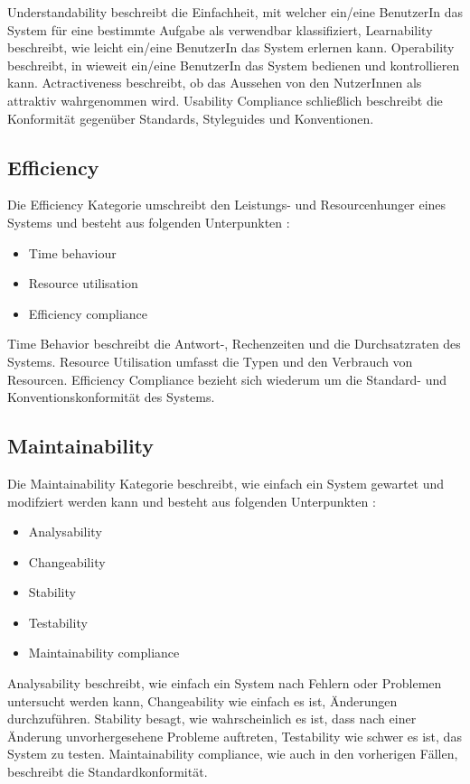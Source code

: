 Understandability beschreibt die Einfachheit, mit welcher ein/eine BenutzerIn das System für eine bestimmte Aufgabe als verwendbar klassifiziert, Learnability beschreibt, wie leicht ein/eine BenutzerIn das System erlernen kann. Operability beschreibt, in wieweit ein/eine BenutzerIn das System bedienen und kontrollieren kann. Actractiveness beschreibt, ob das Aussehen von den NutzerInnen als attraktiv wahrgenommen wird. Usability Compliance schließlich beschreibt die Konformität gegenüber Standards, Styleguides und Konventionen. \cite[S. 9-10]{ISO_SQ}

\subsection{Efficiency}
Die Efficiency Kategorie umschreibt den Leistungs- und Resourcenhunger eines Systems und besteht aus folgenden Unterpunkten \cite[S. 7]{ISO_SQ}:

\begin{itemize}
  \item \glqq Time behaviour\grqq
  \item \glqq Resource utilisation\grqq
  \item \glqq Efficiency compliance\grqq
\end{itemize}

Time Behavior beschreibt die Antwort-, Rechenzeiten und die Durchsatzraten des Systems. Resource Utilisation umfasst die Typen und den Verbrauch von Resourcen. Efficiency Compliance bezieht sich wiederum um die Standard- und Konventionskonformität des Systems. \cite[S. 10]{ISO_SQ}

\subsection{Maintainability}
Die Maintainability Kategorie beschreibt, wie einfach ein System gewartet und modifziert werden kann und besteht aus folgenden Unterpunkten \cite[S. 7]{ISO_SQ}:

\begin{itemize}
  \item \glqq Analysability\grqq
  \item \glqq Changeability\grqq
  \item \glqq Stability\grqq
  \item \glqq Testability\grqq
  \item \glqq Maintainability compliance\grqq
\end{itemize}

Analysability beschreibt, wie einfach ein System nach Fehlern oder Problemen untersucht werden kann, Changeability wie einfach es ist, Änderungen durchzuführen. Stability besagt, wie wahrscheinlich es ist, dass nach einer Änderung unvorhergesehene Probleme auftreten, Testability wie schwer es ist, das System zu testen. Maintainability compliance, wie auch in den vorherigen Fällen, beschreibt die Standardkonformität. \cite[S. 10-11]{ISO_SQ}


